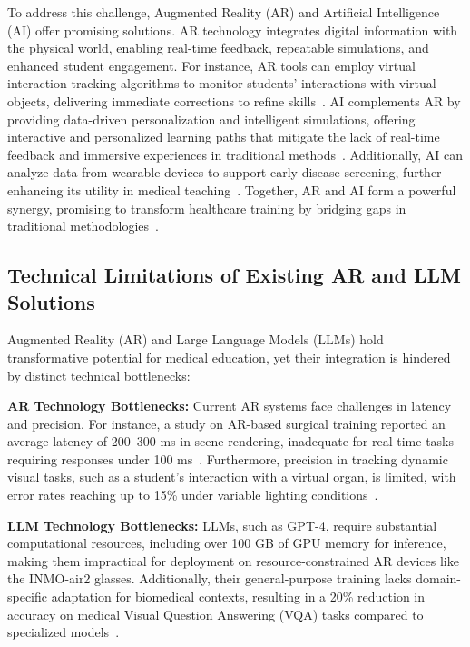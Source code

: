 \documentclass[10pt,letterpaper]{article}
\begin{document}
To address this challenge, Augmented Reality (AR) and Artificial Intelligence (AI) offer promising solutions. AR technology integrates digital information with the physical world, enabling real-time feedback, repeatable simulations, and enhanced student engagement. For instance, AR tools can employ virtual interaction tracking algorithms to monitor students’ interactions with virtual objects, delivering immediate corrections to refine skills~\cite{tang2020augmented, yadav2024use}. AI complements AR by providing data-driven personalization and intelligent simulations, offering interactive and personalized learning paths that mitigate the lack of real-time feedback and immersive experiences in traditional methods~\cite{gordon2024scoping, rasouli2024role}. Additionally, AI can analyze data from wearable devices to support early disease screening, further enhancing its utility in medical teaching~\cite{mcginnis2018wearable}. Together, AR and AI form a powerful synergy, promising to transform healthcare training by bridging gaps in traditional methodologies~\cite{battineni2024ai}.


\subsection*{Technical Limitations of Existing AR and LLM Solutions}

Augmented Reality (AR) and Large Language Models (LLMs) hold transformative potential for medical education, yet their integration is hindered by distinct technical bottlenecks:

\textbf{AR Technology Bottlenecks:} Current AR systems face challenges in latency and precision. For instance, a study on AR-based surgical training reported an average latency of 200--300 ms in scene rendering, inadequate for real-time tasks requiring responses under 100 ms~\cite{safaryan2021enhanced}. Furthermore, precision in tracking dynamic visual tasks, such as a student's interaction with a virtual organ, is limited, with error rates reaching up to 15\% under variable lighting conditions~\cite{battineni2024ai}.

\textbf{LLM Technology Bottlenecks:} LLMs, such as GPT-4, require substantial computational resources, including over 100 GB of GPU memory for inference, making them impractical for deployment on resource-constrained AR devices like the INMO-air2 glasses\cite{gordon2024scoping, chen2022align, chang2022multimodal}. Additionally, their general-purpose training lacks domain-specific adaptation for biomedical contexts, resulting in a 20\% reduction in accuracy on medical Visual Question Answering (VQA) tasks compared to specialized models~\cite{liu2024llavanext}.
\end{document}
